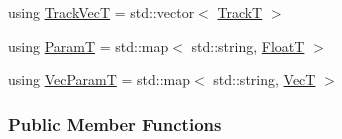 \begin{DoxyCompactItemize}
\item 
using \hyperlink{classtracker_1_1Tracker_a25ee8479eb10f1619a8eefd5d310eeb7}{Track\+VecT} = std\+::vector$<$ \hyperlink{classtracker_1_1Tracker_ac1b06aee1b9d85fb75cf6a9579eb0e84}{TrackT} $>$
\item 
using \hyperlink{classtracker_1_1Tracker_a5fd443ec1139ed82910dd16316100db7}{ParamT} = std\+::map$<$ std\+::string, \hyperlink{classtracker_1_1Tracker_a66e8a81f12871e23082264c964f8f103}{FloatT} $>$
\item 
using \hyperlink{classtracker_1_1Tracker_a1a79f7073d8e1a032369dcc8105604ce}{Vec\+ParamT} = std\+::map$<$ std\+::string, \hyperlink{classtracker_1_1Tracker_a9905fa9b81b252716e651d87d7d57aff}{VecT} $>$
\end{DoxyCompactItemize}
\subsubsection*{Public Member Functions}
